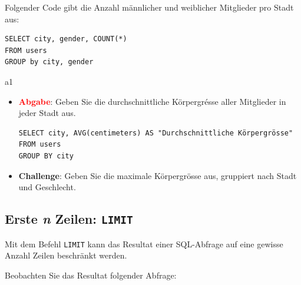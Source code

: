 \begin{myexample}
Folgender Code gibt die Anzahl männlicher und weiblicher Mitglieder pro Stadt aus:
\begin{lstlisting}[style=sql]
SELECT city, gender, COUNT(*) 
FROM users 
GROUP by city, gender
\end{lstlisting}
\end{myexample}


\begin{aufgabe}{a1}
\begin{itemize}
\item {} \textcolor{red}{\textbf{Abgabe}}: Geben Sie die durchschnittliche Körpergrésse aller Mitglieder in jeder Stadt aus.
\begin{myantwort}
\begin{lstlisting}[style=sql]
SELECT city, AVG(centimeters) AS "Durchschnittliche Körpergrösse"
FROM users
GROUP BY city
\end{lstlisting}
\end{myantwort}
\item \textbf{Challenge}: Geben Sie die maximale Körpergrösse aus, gruppiert nach Stadt und Geschlecht.
\end{itemize}


\end{aufgabe}


\subsection{Erste \textit{n} Zeilen: \lstinline[style=sql]|LIMIT|}
Mit dem Befehl \lstinline[style=sql]|LIMIT| kann das Resultat einer SQL-Abfrage auf eine gewisse Anzahl Zeilen beschränkt werden.

Beobachten Sie das Resultat folgender Abfrage:




